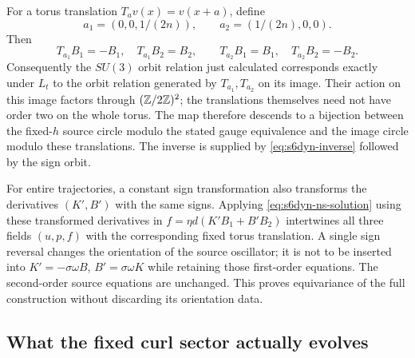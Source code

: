 For a torus translation $T_a v(x)=v(x+a)$, define
\[
 a_1=(0,0,1/(2n)),\qquad a_2=(1/(2n),0,0).
\]
Then
\[
 T_{a_1}B_1=-B_1,\quad T_{a_1}B_2=B_2,\qquad
 T_{a_2}B_1=B_1,\quad T_{a_2}B_2=-B_2.
\]
Consequently the $SU(3)$ orbit relation just calculated corresponds
exactly under $L_t$ to the orbit relation generated by $T_{a_1},T_{a_2}$
on its image. Their action on this image factors through
$(\mathbb Z/2\mathbb Z)^2$; the translations themselves need not have order two on
the whole torus. The map therefore descends to a bijection between the
fixed-$h$ source circle modulo the stated gauge equivalence and the
image circle modulo these translations. The inverse is supplied by
\eqref{eq:s6dyn-inverse} followed by the sign orbit.

For entire trajectories, a constant sign transformation also transforms
the derivatives $(K',B')$ with the same signs. Applying
\eqref{eq:s6dyn-ns-solution} using these transformed derivatives in
$f=\eta d(K'B_1+B'B_2)$ intertwines all three fields $(u,p,f)$ with
the corresponding fixed torus translation. A single sign reversal
changes the orientation of the source oscillator; it is not to be
inserted into $K'=-\sigma\omega B$, $B'=\sigma\omega K$ while
retaining those first-order equations. The second-order source equations
are unchanged. This proves equivariance of the full construction without
discarding its orientation data.

\subsection{What the fixed curl sector actually evolves}

